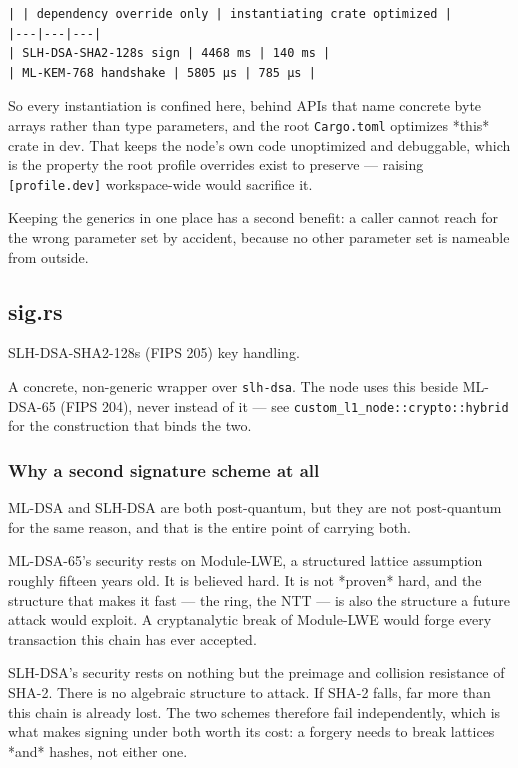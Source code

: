 \documentclass[11pt,a4paper]{article}
\begin{document}
\begin{verbatim}
| | dependency override only | instantiating crate optimized |
|---|---|---|
| SLH-DSA-SHA2-128s sign | 4468 ms | 140 ms |
| ML-KEM-768 handshake | 5805 µs | 785 µs |
\end{verbatim}

So every instantiation is confined here, behind APIs that name concrete byte
arrays rather than type parameters, and the root \texttt{Cargo.toml} optimizes
*this* crate in dev. That keeps the node's own code unoptimized and
debuggable, which is the property the root profile overrides exist to
preserve — raising \texttt{[profile.dev]} workspace-wide would sacrifice it.

Keeping the generics in one place has a second benefit: a caller cannot
reach for the wrong parameter set by accident, because no other parameter
set is nameable from outside.

\subsection{sig.rs}
SLH-DSA-SHA2-128s (FIPS 205) key handling.

A concrete, non-generic wrapper over \texttt{slh-dsa}. The node uses this beside
ML-DSA-65 (FIPS 204), never instead of it — see
\texttt{custom\_l1\_node::crypto::hybrid} for the construction that binds the two.

\subsubsection{Why a second signature scheme at all}

ML-DSA and SLH-DSA are both post-quantum, but they are not post-quantum for
the same reason, and that is the entire point of carrying both.

ML-DSA-65's security rests on Module-LWE, a structured lattice assumption
roughly fifteen years old. It is believed hard. It is not *proven* hard, and
the structure that makes it fast — the ring, the NTT — is also the structure
a future attack would exploit. A cryptanalytic break of Module-LWE would
forge every transaction this chain has ever accepted.

SLH-DSA's security rests on nothing but the preimage and collision
resistance of SHA-2. There is no algebraic structure to attack. If SHA-2
falls, far more than this chain is already lost. The two schemes therefore
fail independently, which is what makes signing under both worth its cost:
a forgery needs to break lattices *and* hashes, not either one.
\end{document}
